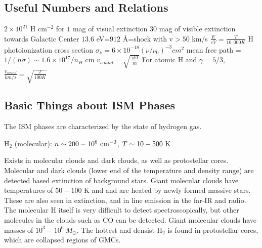 	

\subsection{Useful Numbers and Relations}
$2\times10^{21}$ H cm$^{-2}$ for $1$ mag of visual extinction\newline
\newline
$30$ mag of visible extinction towards Galactic Center\newline
\newline
$13.6$ eV=$912$ \AA=shock with v$>50$ km/s\newline
\newline
$\frac{E}{eV}=\frac{T}{10,000 K}$\newline
\newline
H photoionization cross section $\sigma_{\nu}=6\times10^{-18}(\nu/\nu_0)^{-3}
cm^2$\newline
\newline
mean free path = $1/(n\sigma)\sim 1.6\times10^{17}/n_H$ cm\newline
\newline
$v_{sound}=\sqrt{\frac{\gamma kT}{m}}$\newline
\newline
For atomic H and $\gamma=5/3$,\newline
\newline
$\frac{v_{sound}}{km/s}=\sqrt{\frac{T}{100 K}}$

\subsection{Basic Things about ISM Phases}

The ISM phases are characterized by the state of hydrogen gas.

H$_2$ (molecular): $n \sim 200-10^6~{\rm cm}^{-3}$, $T \sim 10-500~{\rm K}$

Exists in molecular clouds and dark clouds, as well as protostellar cores.  
Molecular and dark clouds (lower end of the temperature and density range) are 
detected based extinction of background stars.  Giant molecular clouds 
have temperatures of $50-100$ K and and are heated by newly formed massive 
stars.  These are also seen in extinction, and in line emission in the far-IR 
and radio.  The molecular H itself is very difficult to detect 
spectroscopically, but other molecules in the clouds such as CO can be 
detected.  Giant molecular clouds have masses of 
$10^3-10^6\ M_{\odot}$.  The hottest and densist H$_2$ is found in protostellar 
cores, which are collapsed regions of GMCs.  

